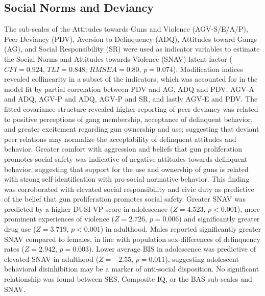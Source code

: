 \documentclass[utf8]{frontiersSCNS} %
\begin{document}
\subsection{Social Norms and Deviancy} The sub-scales of the Attitudes towards Guns and Violence (AGV-S/E/A/P), Peer Deviancy (PDV), Aversion to Delinquency (ADQ), Attitudes toward Gangs (AG), and Social Responsibility (SR) were used as indicator variables to estimate the Social Norms and Attitudes towards Violence (SNAV) latent factor ($CFI=0.924$, $TLI=0.848$; $RMSEA=0.80$, $p=0.074$). Modification indices revealed collinearity in a subset of the indicators, which was accounted for in the model fit by partial correlation between PDV and AG, ADQ and PDV, AGV-A and ADQ, AGV-P and ADQ, AGV-P and SR, and lastly AGV-E and PDV. The fitted covariance structure revealed higher reporting of peer deviancy was related to positive perceptions of gang membership, acceptance of delinquent behavior, and greater excitement regarding gun ownership and use; suggesting that deviant peer relations may normalize the acceptability of delinquent attitudes and behavior. Greater comfort with aggression and beliefs that gun proliferation promotes social safety was indicative of negative attitudes towards delinquent behavior, suggesting that support for the use and ownership of guns is related with strong self-identification with pro-social normative behavior. This finding was corroborated with elevated social responsibility and civic duty as predictive of the belief that gun proliferation promotes social safety. Greater SNAV was predicted by a higher DUSI-VP score in adolescence ($Z=4.523$, $p<0.001$), more prominent experiences of violence ($Z=2.726$, $p=0.006$) and significantly greater drug use ($Z=3.719$, $p<0.001$) in adulthood. Males reported significantly greater SNAV compared to females, in line with population sex-differences of delinquency rates ($Z=2.942$, $p=0.003$). Lower average BIS in adolescence was predictive of elevated SNAV in adulthood ($Z=-2.55$, $p=0.011$), suggesting adolescent behavioral disinhibition may be a marker of anti-social disposition. No significant relationship was found between SES, Composite IQ, or the BAS sub-scales and SNAV.
\end{document}
